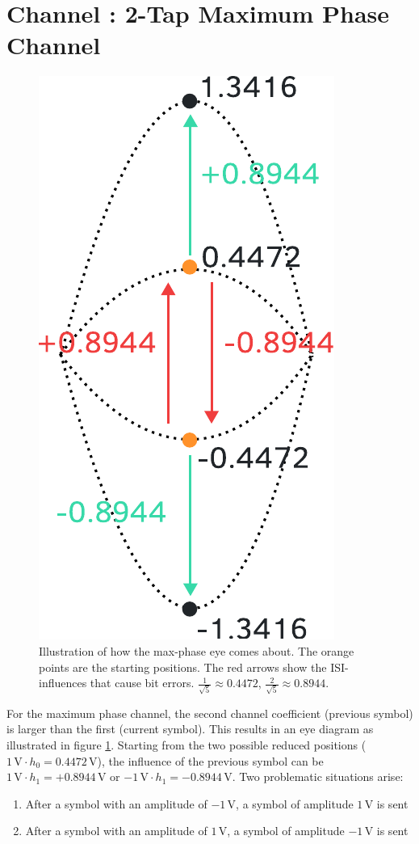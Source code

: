 \documentclass[10pt, a4paper]{article}
\newcommand{\upperRomannumeral}[1]{\uppercase\expandafter{\romannumeral#1}}
\begin{document}
\section{Channel \upperRomannumeral{2}: 2-Tap Maximum Phase Channel}
\begin{figure}%
\centering
\includegraphics[height=0.3\textheight]{graphics/max_phase_eye_explanation.pdf}
\caption{Illustration of how the max-phase eye comes about. The orange points are the starting positions. The red arrows show the ISI-influences that cause bit errors. $\frac{1}{\sqrt{5}}\approx 0.4472$, $\frac{2}{\sqrt{5}}\approx 0.8944$.}\label{fig:two_tap_max_phase_illustration}
\end{figure}

For the maximum phase channel, the second channel coefficient (previous symbol) is larger than the first (current symbol). This results in an eye diagram as illustrated in figure \ref{fig:two_tap_max_phase_illustration}. Starting from the two possible reduced positions ($1\,\si{\volt}\cdot h_{0} = 0.4472\,\si{\volt}$), the influence of the previous symbol can be $1\,\si{\volt}\cdot h_{1} = +0.8944\,\si{\volt}$ or $-1\,\si{\volt}\cdot h_{1} = -0.8944\,\si{\volt}$. Two problematic situations arise:
\begin{enumerate}
        \item After a symbol with an amplitude of $-1\,\si{\volt}$, a symbol of amplitude $1\,\si{\volt}$ is sent
        \item After a symbol with an amplitude of $1\,\si{\volt}$, a symbol of amplitude $-1\,\si{\volt}$ is sent
\end{enumerate}
\end{document}
